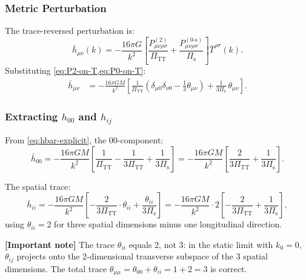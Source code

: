 \documentclass[11pt,a4paper]{article}
\theoremstyle{plain}
\theoremstyle{definition}
\theoremstyle{remark}
\newcommand{\signcorrection}[1]{%
  \par\smallskip\noindent
  \colorbox{red!10}{\parbox{\dimexpr\linewidth-2\fboxsep}{%
    \textcolor{red!60!black}{\textbf{[Important note]}} #1}}%
  \par\smallskip}
\begin{document}
\subsubsection{Metric Perturbation}

The trace-reversed perturbation is:
\begin{equation}\label{eq:hbar}
  \bar{h}_{\mu\nu}(k) = -\frac{16\pi G}{k^2}
  \left[
    \frac{P^{(2)}_{\mu\nu\rho\sigma}}{\Pi_{\mathrm{TT}}}
    + \frac{P^{(0\text{-s})}_{\mu\nu\rho\sigma}}{\Pi_{\mathrm{s}}}
  \right]\bar{T}^{\rho\sigma}(k).
\end{equation}
Substituting \cref{eq:P2-on-T,eq:P0-on-T}:
\begin{align}
  \bar{h}_{\mu\nu}
  &= -\frac{16\pi GM}{k^2}\left[
    \frac{1}{\Pi_{\mathrm{TT}}}\left(\delta_{\mu 0}\delta_{\nu 0}
    - \frac{1}{3}\theta_{\mu\nu}\right)
    + \frac{1}{3\Pi_{\mathrm{s}}}\,\theta_{\mu\nu}
  \right].
  \label{eq:hbar-explicit}
\end{align}

\subsubsection{Extracting $h_{00}$ and $h_{ij}$}

From \cref{eq:hbar-explicit}, the 00-component:
\begin{equation}
  \bar{h}_{00} = -\frac{16\pi GM}{k^2}\left[
    \frac{1}{\Pi_{\mathrm{TT}}}
    - \frac{1}{3\Pi_{\mathrm{TT}}}
    + \frac{1}{3\Pi_{\mathrm{s}}}
  \right]
  = -\frac{16\pi GM}{k^2}\left[
    \frac{2}{3\Pi_{\mathrm{TT}}}
    + \frac{1}{3\Pi_{\mathrm{s}}}
  \right].
\end{equation}

The spatial trace:
\begin{equation}
  \bar{h}_{ii} = -\frac{16\pi GM}{k^2}\left[
    -\frac{2}{3\Pi_{\mathrm{TT}}}\cdot\theta_{ii}
    + \frac{\theta_{ii}}{3\Pi_{\mathrm{s}}}
  \right]
  = -\frac{16\pi GM}{k^2}\cdot 2\left[
    -\frac{2}{3\Pi_{\mathrm{TT}}}
    + \frac{1}{3\Pi_{\mathrm{s}}}
  \right],
\end{equation}
using $\theta_{ii} = 2$ for three spatial dimensions minus one
longitudinal direction.

\signcorrection{The trace $\theta_{ii}$ equals 2, not 3: in the
static limit with $k_0 = 0$, $\theta_{ij}$ projects onto the
2-dimensional transverse subspace of the 3 spatial dimensions.
The total trace $\theta_{\mu\mu} = \theta_{00} + \theta_{ii}
= 1 + 2 = 3$ is correct.}
\end{document}
